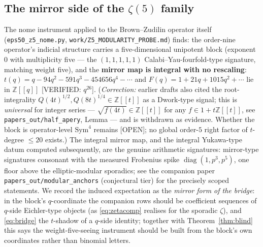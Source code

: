 \documentclass[11pt,reqno]{amsart}
\theoremstyle{plain}
\theoremstyle{definition}
\theoremstyle{remark}
\newcommand{\Z}{\mathbb{Z}}
\newcommand{\VerifiedR}[1]{\textup{\textsf{[VERIFIED: #1]}}}
\newcommand{\Open}{\textup{\textsf{[OPEN]}}}
\begin{document}
\subsection{The mirror side of the $\zeta(5)$ family}
The nome instrument applied to the Brown--Zudilin operator itself
(\texttt{eps50\_z5\_nome.py}, \texttt{work/Z5\_MODULARITY\_PROBE.md})
finds: the order-nine operator's indicial structure carries a
five-dimensional unipotent block (exponent $0$ with multiplicity five ---
the $(1,1,1,1,1)$ Calabi--Yau-fourfold-type signature, matching weight
five), and the \textbf{mirror map is integral with no rescaling}:
$t(q)=q-94q^2-591q^3-454656q^4-\cdots$ and $F(q)=1+21q+1015q^2+\cdots$
lie in $\Z[[q]]$ \VerifiedR{$q^{26}$}. (\emph{Correction:} earlier drafts
also cited the root-integrality $Q(4t)^{1/2},Q(8t)^{1/4}\in\Z[[t]]$ as a
Dwork-type signal; this is \emph{universal} for integer series ---
$\sqrt{f(4t)}\in\Z[[t]]$ for any $f\in1+t\Z[[t]]$, see
\texttt{papers\_out/half\_apery}, Lemma --- and is withdrawn as evidence.
Whether the block is operator-level $\mathrm{Sym}^4$ remains \Open; no
global order-$5$ right factor of $t$-degree $\le20$ exists.) The integral
mirror map, and the integral Yukawa-type datum computed subsequently, are
the genuine arithmetic signatures: mirror-type signatures consonant with
the measured Frobenius spike $\operatorname{diag}(1,p^3,p^5)$, one floor
above the elliptic-modular sporadics; see the companion paper
\texttt{papers\_out/modular\_anchors} (conjectural tier) for the
precisely scoped statements. We record the induced expectation as the
\emph{mirror form of the bridge}: in the block's $q$-coordinate the
companion rows should be coefficient sequences of $q$-side Eichler-type
objects (as \eqref{eq:zetacomp} realises for the sporadic $\zeta$), and
\eqref{eq:bridge} the $t$-shadow of a $q$-side identity; together with
Theorem~\ref{thm:blind} this says the weight-five-seeing instrument
should be built from the block's own coordinates rather than binomial
letters.
\end{document}
